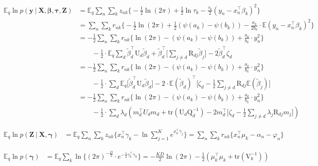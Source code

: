 \documentclass[twoside,11pt]{article}
\newcommand\given[1][]{\:#1\vert\:}
\newcommand{\transpose}[1]{#1^{\intercal}}
\newcommand{\nsum}{\sum\limits_{n}}
\newcommand{\ksum}{\sum\limits_{k}}
\newcommand{\boldbeta}{\boldsymbol\beta}
\newcommand{\boldgamma}{\boldsymbol\gamma}
\newcommand{\boldtau}{\boldsymbol\tau}
\newcommand{\E}{\mathbb{E}}
\newcommand{\betad}{\tilde{\beta}_d}
\newcommand{\trace}[1]{\mathrm{tr} \left( #1 \right)}
\begin{document}
\begin{align*}
	\E_q \ln p\left( \mathbf{y} \given \mathbf{X}, \boldbeta, \boldtau, \mathbf{Z} \right) &= 
	\E_q \nsum \ksum z_{nk} \Big\{ - \frac{1}{2} \ln(2\pi) + \frac{1}{2} \ln \tau_k - \frac{\tau_k}{2}(y_n - \transpose{x_n} \beta_k)^2\Big\} \\
	&= \nsum \ksum r_{nk} \Big\{ - \frac{1}{2} \ln(2\pi) + \frac{1}{2} (\psi(a_k) - \psi(b_k)) - \frac{a_k}{2b_k} \cdot \E(y_n - \transpose{x_n} \beta_k)^2\Big\} \\
	&= - \frac{1}{2} \nsum \ksum r_{nk} \Big\{  \ln(2\pi) - (\psi(a_k) - \psi(b_k)) + \frac{a_k}{b_k} \cdot y_n^2 \Big\} \\ & \qquad -\frac{1}{2} \cdot \E_q \sum_d \transpose{\betad} \mathrm{U}_d \betad + \transpose{\betad} \Bigg[\sum_{j \neq d} \mathrm{R}_{dj} \tilde{\beta}_j \Bigg] - 2 \transpose{\betad} \zeta_d \\
	&= - \frac{1}{2} \nsum \ksum r_{nk} \Big\{  \ln(2\pi) - (\psi(a_k) - \psi(b_k)) + \frac{a_k}{b_k} \cdot y_n^2 \Big\} \\ & \qquad -\frac{1}{2} \cdot \sum_d \E_q \Big[ \transpose{\betad} \mathrm{U}_d \betad \Big] - 2 \cdot \transpose{\E\left(\betad\right)} \Bigg[ \zeta_d - \frac{1}{2} \sum_{j \neq d} \mathrm{R}_{dj} \E\left(\tilde{\beta}_j\right) \Bigg] \\
	&= - \frac{1}{2} \nsum \ksum r_{nk} \Big\{  \ln(2\pi) - (\psi(a_k) - \psi(b_k)) + \frac{a_k}{b_k} \cdot y_n^2 \Big\} \\ & \qquad - \frac{1}{2} \cdot \sum_d \lambda_d \left( \transpose{m_d} U_d m_d + \trace{\mathrm{U}_d \mathrm{Q}_d^{-1}} - 2\transpose{m_d} \Bigg[ \zeta_d - \frac{1}{2} \sum_{j\neq d} \lambda_j \mathrm{R}_{dj} m_j\Bigg] \right)
\end{align*}

\begin{align*}
	\E_q \ln p\left( \mathbf{Z} \given \mathbf{X}, \boldgamma \right) &= \E_q \nsum \ksum z_{nk} \Big\{ \transpose{x_n} \gamma_k - \ln \sum_{j=1}^K e^{\transpose{x_n}\gamma_j}\Big\} = \nsum \ksum r_{nk} \Big\{ \transpose{x_n} \mu_k - \alpha_n - \varphi_n \Big\}
\end{align*}

\begin{align*}
	\E_q \ln p\left( \boldgamma \right) &= \E_q \ksum  \ln \Big\{ (2\pi)^{-\frac{D}{2}} \cdot e^{-\frac{1}{2} \transpose{\gamma_k}\gamma_k}\Big\} = -\frac{KD}{2} \ln(2\pi) - \frac{1}{2} \left( \transpose{\mu_k} \mu_k + \trace{\mathrm{V}_k^{-1}} \right)
\end{align*}
\end{document}

